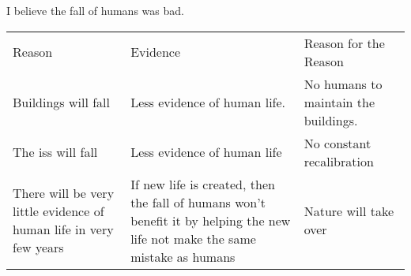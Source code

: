 
I believe the fall of humans was bad.

\begin{tabularx}{\textwidth}{XXX}
  Reason & Evidence & Reason for the Reason \\
  Buildings will fall &  Less evidence of human life. & No humans to maintain the buildings.\\
  The iss will fall & Less evidence of human life & No constant recalibration \\
  There will be very little evidence of human life in very few years &  If new life is created, then the fall of humans \index{fall of humans} won’t benefit it by helping the new life not make the same mistake as humans &  Nature will take over \\
\end{tabularx}



